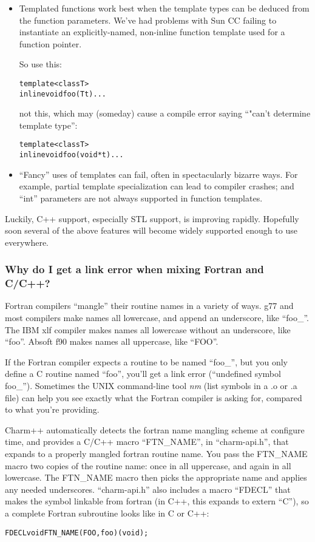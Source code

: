 \begin{itemize}
\item Templated functions work best when the template types can 
be deduced from the function parameters.  We've had problems with
Sun CC failing to instantiate an explicitly-named, non-inline
function template used for a function pointer.

So use this:
\begin{alltt}
template <class T>
inline void foo(T t) {...}
\end{alltt}
not this, which may (someday) cause a compile error saying 
``"can't determine template type'':
\begin{alltt}
template <class T>
inline void foo(void *t) {...}
\end{alltt}

\item ``Fancy'' uses of templates can fail, often in spectacularly
bizarre ways.  For example, partial template specialization can 
lead to compiler crashes; and ``int'' parameters are not always 
supported in function templates. 

\end{itemize}

Luckily, C++ support, especially STL support, is improving
rapidly.  Hopefully soon several of the above features will
become widely supported enough to use everywhere.

\subsubsection{Why do I get a link error when mixing Fortran and C/C++?}

\label{f2c}

Fortran compilers ``mangle'' their routine names in a variety
of ways.  g77 and most compilers make names all lowercase, and 
append an underscore, like ``foo\_''.  The IBM xlf compiler makes 
names all lowercase without an underscore, like ``foo''. Absoft f90 
makes names all uppercase, like ``FOO''. 

If the Fortran compiler expects a routine to be named ``foo\_'',
but you only define a C routine named ``foo'', you'll get a link 
error (``undefined symbol foo\_'').  Sometimes the UNIX command-line
tool {\em nm} (list symbols in a .o or .a file) can help you see exactly what the 
Fortran compiler is asking for, compared to what you're providing.

Charm++ automatically detects the fortran name mangling scheme
at configure time, and provides a C/C++ macro ``FTN\_NAME'', in ``charm-api.h'',
that expands to a properly mangled fortran routine name.
You pass the FTN\_NAME macro
two copies of the routine name: once in all uppercase, and again 
in all lowercase.
The FTN\_NAME macro then picks the appropriate name and applies any
needed underscores.  ``charm-api.h'' also includes a macro ``FDECL''
that makes the symbol linkable from fortran (in C++, this expands
to extern ``C''), so a complete Fortran subroutine looks like in C or C++:
\begin{alltt}
FDECL void FTN\_NAME(FOO,foo)(void);
\end{alltt}

